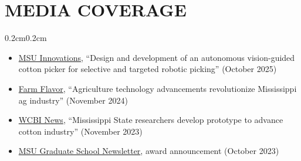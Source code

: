 \documentclass[10pt, letterpaper]{article}
\newenvironment{highlights}{%
    \begin{itemize}[topsep=0.08cm, parsep=0.08cm, partopsep=0pt,
                    itemsep=0pt, leftmargin=0.4cm + 10pt]
}{\end{itemize}}
\newenvironment{onecolentry}{%
    \begin{adjustwidth}{0.2cm}{0.2cm}
}{\end{adjustwidth}}
\begin{document}
\section{MEDIA COVERAGE}
\vspace{0.08cm}
\begin{onecolentry}
    \begin{highlights}
        \item \href{https://msstate-innovations.technologypublisher.com/technology/58899}{MSU
              Innovations}, ``Design and development of an autonomous vision-guided
              cotton picker for selective and targeted robotic picking''
              (October 2025)
        \item \href{https://farmflavor.com/mississippi/mississippi-technology/agriculture-technology-advancements-revolutionize-mississippi-ag-industry/}{Farm
              Flavor}, ``Agriculture technology advancements revolutionize
              Mississippi ag industry'' (November 2024)
        \item \href{https://www.wcbi.com/mississippi-state-researchers-develop-prototype-to-advance-cotton-industry/}{WCBI
              News}, ``Mississippi State researchers develop prototype to advance
              cotton industry'' (November 2023)
        \item \href{https://issuu.com/gradmarketing/docs/newsletter_-_ragged/40}{MSU
              Graduate School Newsletter}, award announcement (October 2023)
    \end{highlights}
\end{onecolentry}
\vspace{0.10cm}
\end{document}
